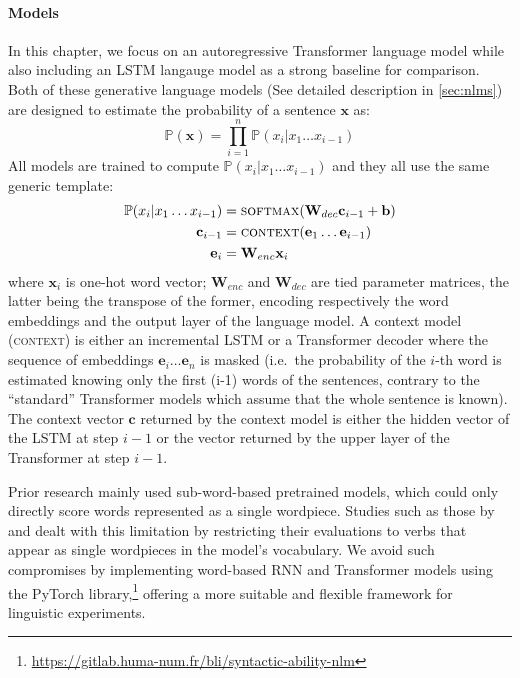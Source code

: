 \paragraph{Models}
In this chapter, we focus on an autoregressive Transformer language model while also including an LSTM langauge model as a strong baseline for comparison. Both of these generative language models (See detailed description in \textsection\ref{sec:nlms}) are designed to estimate the probability of a sentence $\mathbf{x}$ as:
\begin{equation}
\mathbb{P}(\mathbf{x}) = \prod_{i=1}^n \mathbb{P}(x_i|x_1\ldots x_{i-1})
\end{equation}
All models are trained to compute 
$\mathbb{P}(x_i|x_1\ldots x_{i-1})$ and they all use the same generic template:
\begin{align}
    \mathbb{P}(x_i|x_1\ldots x_{i-1}) &= \textsc{softmax}(\mathbf{W}_{dec} \mathbf{c}_{i-1}+\mathbf{b})\\
    \mathbf{c}_{i-1} &= \textsc{context}(\mathbf{e}_1\ldots \mathbf{e}_{i-1}) \\
    \mathbf{e}_i&= \mathbf{W}_{enc}\mathbf{x}_i
\end{align}
where $\mathbf{x}_i$ is one-hot word vector; $\mathbf{W}_{enc}$ and
$\mathbf{W}_{dec}$ are tied parameter matrices, the latter being the
transpose of the former, encoding respectively the word embeddings and
the output layer of the language model. A context model (\textsc{context}) is either an incremental LSTM or a
Transformer decoder where the sequence of embeddings
$\mathbf{e}_i\ldots \mathbf{e}_n$ is masked (i.e.\ the probability of
the $i$-th word is estimated knowing only the first (i-1) words of
the sentences, contrary to the “standard” Transformer models which
assume that the whole sentence is known). The context vector
$\mathbf{c}$ returned by the context model is either the hidden vector
of the LSTM at step $i-1$ or the vector returned by the upper layer of
the Transformer at step $i-1$.

Prior research mainly used sub-word-based pretrained models, which could only directly score words represented as a single wordpiece. 
Studies such as those by \cite{goldberg19assessing} and \cite{lasri-etal-2022-probing} dealt with this limitation by restricting their evaluations to verbs that appear as single wordpieces in the model’s vocabulary. We avoid such compromises by implementing word-based RNN and Transformer models using the PyTorch library,\footnote{\url{https://gitlab.huma-num.fr/bli/syntactic-ability-nlm}} offering a more suitable and flexible framework for linguistic experiments. 

